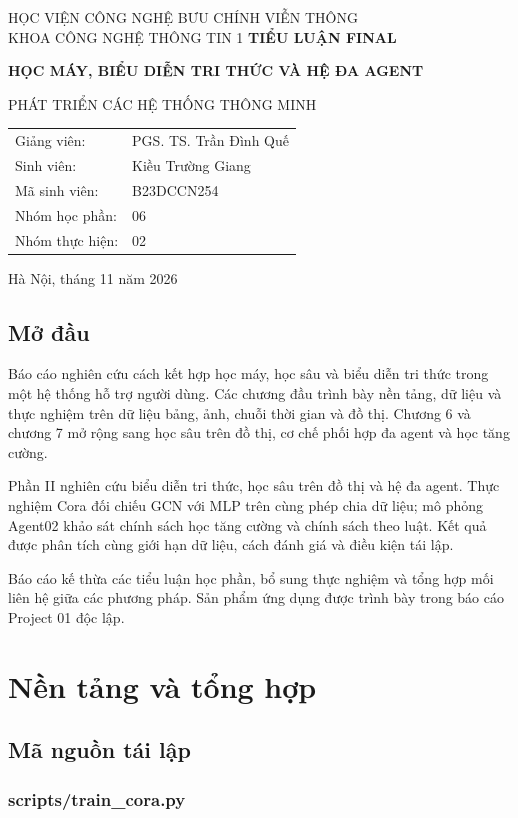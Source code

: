 \documentclass[12pt,a4paper,oneside]{report}
\begin{document}
\begin{titlepage}\centering
{\large HỌC VIỆN CÔNG NGHỆ BƯU CHÍNH VIỄN THÔNG\\KHOA CÔNG NGHỆ THÔNG TIN 1}\vfill
{\LARGE\bfseries TIỂU LUẬN FINAL}\par\vspace{1cm}
{\Large\bfseries HỌC MÁY, BIỂU DIỄN TRI THỨC VÀ HỆ ĐA AGENT}\par\vspace{1cm}
{\large PHÁT TRIỂN CÁC HỆ THỐNG THÔNG MINH}\vfill
\begin{tabular}{ll}Giảng viên:&PGS. TS. Trần Đình Quế\\Sinh viên:&Kiều Trường Giang\\Mã sinh viên:&B23DCCN254\\Nhóm học phần:&06\\Nhóm thực hiện:&02\end{tabular}\vfill
Hà Nội, tháng 11 năm 2026\end{titlepage}\tableofcontents\clearpage\listoffigures\clearpage\listoftables\clearpage{}
\chapter*{Mở đầu}
Báo cáo nghiên cứu cách kết hợp học máy, học sâu và biểu diễn tri thức trong một hệ thống hỗ trợ người dùng. Các chương đầu trình bày nền tảng, dữ liệu và thực nghiệm trên dữ liệu bảng, ảnh, chuỗi thời gian và đồ thị. Chương 6 và chương 7 mở rộng sang học sâu trên đồ thị, cơ chế phối hợp đa agent và học tăng cường.

Phần II nghiên cứu biểu diễn tri thức, học sâu trên đồ thị và hệ đa agent. Thực nghiệm Cora đối chiếu GCN với MLP trên cùng phép chia dữ liệu; mô phỏng Agent02 khảo sát chính sách học tăng cường và chính sách theo luật. Kết quả được phân tích cùng giới hạn dữ liệu, cách đánh giá và điều kiện tái lập.

Báo cáo kế thừa các tiểu luận học phần, bổ sung thực nghiệm và tổng hợp mối liên hệ giữa các phương pháp. Sản phẩm ứng dụng được trình bày trong báo cáo Project 01 độc lập.
\part{Nền tảng và tổng hợp}\appendix\chapter{Mã nguồn tái lập}
\section{scripts/train\_cora.py}
\end{document}
